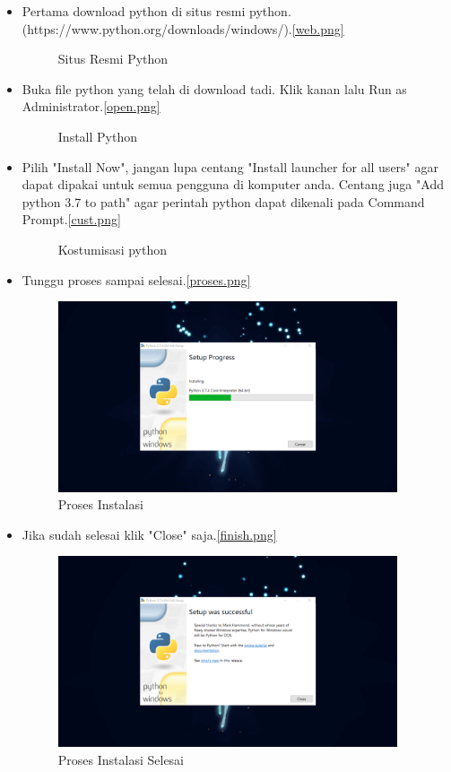\documentclass{article}
\begin{document}
\begin{itemize}
\item Pertama download python di situs resmi python. (https://www.python.org/downloads/windows/).\ref{web.png}
\begin{figure}[!htbp]
	\centering
	\caption{Situs Resmi Python}
\end{figure}
\item Buka file python yang telah di download tadi. Klik kanan lalu Run as Administrator.\ref{open.png}
\begin{figure}[!htbp]
	\centering
	\caption{Install Python}
\end{figure}
\item Pilih "Install Now", jangan lupa centang "Install launcher for all users" agar dapat dipakai untuk semua pengguna di komputer anda. Centang juga "Add python 3.7 to path" agar perintah python dapat dikenali pada Command Prompt.\ref{cust.png}
\begin{figure}[!htbp]
	\centering
	\caption{Kostumisasi python}
\end{figure}
\item Tunggu proses sampai selesai.\ref{proses.png}
\begin{figure}[!htbp]
	\centering
	\includegraphics[width=10cm]{figures/pro.png}
	\caption{Proses Instalasi}
\end{figure}
\item Jika sudah selesai klik "Close" saja.\ref{finish.png}
\begin{figure}[!htbp]
	\centering
	\includegraphics[width=10cm]{figures/finish.png}
	\caption{Proses Instalasi Selesai}
\end{figure}
\end{itemize}
\end{document}
